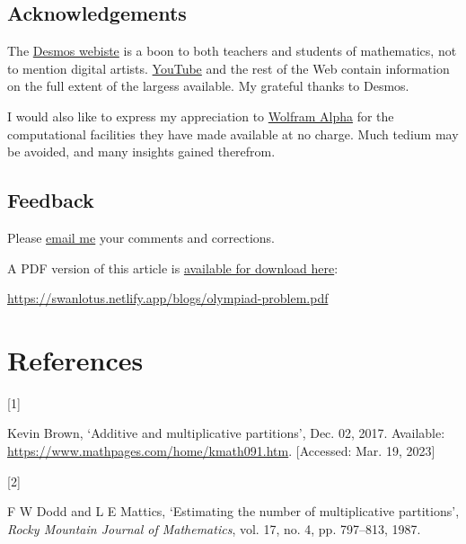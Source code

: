\documentclass[
  a4paper,
]{article}
\newlength{\cslhangindent}
\newlength{\csllabelwidth}
\newlength{\cslentryspacingunit} %
\newenvironment{CSLReferences}[2] %
 {%
  \setlength{\parindent}{0pt}
  \ifodd #1
  \let\oldpar\par
  \def\par{\hangindent=\cslhangindent\oldpar}
  \fi
  \setlength{\parskip}{#2\cslentryspacingunit}
 }%
 {}
\newcommand{\CSLLeftMargin}[1]{\parbox[t]{\csllabelwidth}{#1}}
\newcommand{\CSLRightInline}[1]{\parbox[t]{\linewidth - \csllabelwidth}{#1}\break}
\begin{document}
\hypertarget{acknowledgements}{%
\subsection{Acknowledgements}\label{acknowledgements}}

The \href{https://www.desmos.com/}{Desmos webiste} is a boon to both
teachers and students of mathematics, not to mention digital artists.
\href{desmos}{YouTube} and the rest of the Web contain information on
the full extent of the largess available. My grateful thanks to Desmos.

I would also like to express my appreciation to
\href{https://www.wolframalpha.com/}{Wolfram Alpha} for the
computational facilities they have made available at no charge. Much
tedium may be avoided, and many insights gained therefrom.

\hypertarget{feedback}{%
\subsection{Feedback}\label{feedback}}

Please \href{mailto:feedback.swanlotus@gmail.com}{email me} your
comments and corrections.

\noindent A PDF version of this article is
\href{./olympiad-problem.pdf}{available for download here}:

\begin{small}

\begin{sffamily}

\url{https://swanlotus.netlify.app/blogs/olympiad-problem.pdf}

\end{sffamily}

\end{small}

\hypertarget{bibliography}{%
\section*{References}\label{bibliography}}

\hypertarget{refs}{}
\begin{CSLReferences}{0}{0}
\leavevmode{}%
\CSLLeftMargin{{[}1{]} }%
\CSLRightInline{Kevin Brown, {`Additive and multiplicative partitions'},
Dec. 02, 2017. Available:
\url{https://www.mathpages.com/home/kmath091.htm}. {[}Accessed: Mar. 19,
2023{]}}

\leavevmode{}%
\CSLLeftMargin{{[}2{]} }%
\CSLRightInline{F W Dodd and L E Mattics, {`Estimating the number of
multiplicative partitions'}, \emph{Rocky Mountain Journal of
Mathematics}, vol. 17, no. 4, pp. 797--813, 1987.}

\end{CSLReferences}
\end{document}
